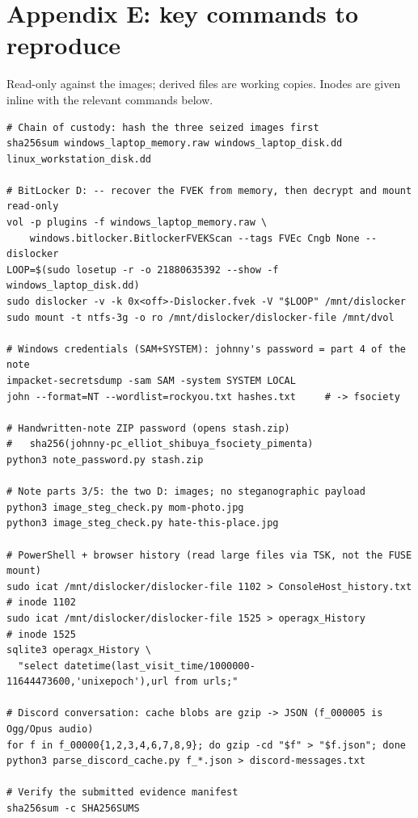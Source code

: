 \documentclass[11pt,a4paper,final,oneside]{article}
\begin{document}
\section*{Appendix E: key commands to reproduce}

Read-only against the images; derived files are working copies. Inodes are given
inline with the relevant commands below.

{\scriptsize
\begin{verbatim}
# Chain of custody: hash the three seized images first
sha256sum windows_laptop_memory.raw windows_laptop_disk.dd linux_workstation_disk.dd

# BitLocker D: -- recover the FVEK from memory, then decrypt and mount read-only
vol -p plugins -f windows_laptop_memory.raw \
    windows.bitlocker.BitlockerFVEKScan --tags FVEc Cngb None --dislocker
LOOP=$(sudo losetup -r -o 21880635392 --show -f windows_laptop_disk.dd)
sudo dislocker -v -k 0x<off>-Dislocker.fvek -V "$LOOP" /mnt/dislocker
sudo mount -t ntfs-3g -o ro /mnt/dislocker/dislocker-file /mnt/dvol

# Windows credentials (SAM+SYSTEM): johnny's password = part 4 of the note
impacket-secretsdump -sam SAM -system SYSTEM LOCAL
john --format=NT --wordlist=rockyou.txt hashes.txt     # -> fsociety

# Handwritten-note ZIP password (opens stash.zip)
#   sha256(johnny-pc_elliot_shibuya_fsociety_pimenta)
python3 note_password.py stash.zip

# Note parts 3/5: the two D: images; no steganographic payload
python3 image_steg_check.py mom-photo.jpg
python3 image_steg_check.py hate-this-place.jpg

# PowerShell + browser history (read large files via TSK, not the FUSE mount)
sudo icat /mnt/dislocker/dislocker-file 1102 > ConsoleHost_history.txt   # inode 1102
sudo icat /mnt/dislocker/dislocker-file 1525 > operagx_History          # inode 1525
sqlite3 operagx_History \
  "select datetime(last_visit_time/1000000-11644473600,'unixepoch'),url from urls;"

# Discord conversation: cache blobs are gzip -> JSON (f_000005 is Ogg/Opus audio)
for f in f_00000{1,2,3,4,6,7,8,9}; do gzip -cd "$f" > "$f.json"; done
python3 parse_discord_cache.py f_*.json > discord-messages.txt

# Verify the submitted evidence manifest
sha256sum -c SHA256SUMS
\end{verbatim}
}
\end{document}
